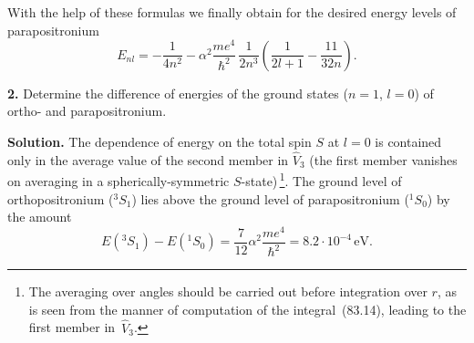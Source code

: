 With the help of these formulas we finally obtain for the desired energy levels of parapositronium
\[
E_{nl} = -\frac{1}{4n^2}-\alpha^2\frac{me^4}{\hbar^2}\,\frac{1}{2n^3}\left(\frac{1}{2l+1}-\frac{11}{32n}\right).
\]

\textbf{2.} Determine the difference of energies of the ground states ($n = 1$, $l = 0$) of ortho- and parapositronium.

\textbf{Solution.} The dependence of energy on the total spin $S$ at $l = 0$ is contained only in the average value of the second member in $\hat{V}_3$ (the first member vanishes on averaging in a spherically-symmetric $S$-state)\,\footnote{The averaging over angles should be carried out before integration over $r$, as is seen from the manner of computation of the integral~(83.14), leading to the first member in~$\hat{V}_3$.}. The ground level of orthopositronium (${}^3S_1$) lies above the ground level of parapositronium (${}^1S_0$) by the amount
\[
E({}^3S_1)-E({}^1S_0) = \frac{7}{12}\alpha^2\frac{me^4}{\hbar^2} = 8.2\cdot 10^{-4}\,\text{eV}.
\]
